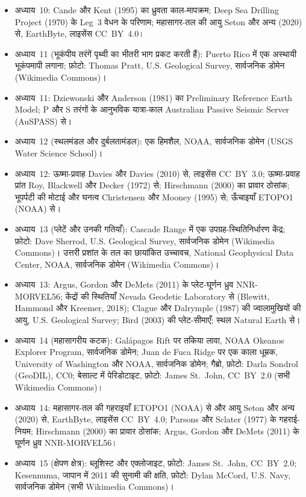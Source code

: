 \begin{itemize}
  \item अध्याय~10: Cande और Kent (1995) का ध्रुवता काल-मापक्रम; Deep Sea Drilling Project (1970) के Leg~3 वेधन के परिणाम; महासागर-तल की आयु Seton और अन्य (2020) से, EarthByte, लाइसेंस CC~BY~4.0।
  \item अध्याय~11 (भूकंपीय तरंगें पृथ्वी का भीतरी भाग प्रकट करती हैं): Puerto Rico में एक अस्थायी भूकंपमापी लगाना; फ़ोटो: Thomas Pratt, U.S. Geological Survey, सार्वजनिक डोमेन (Wikimedia Commons)।
  \item अध्याय~11: Dziewonski और Anderson (1981) का Preliminary Reference Earth Model; P और S तरंगों के आनुभविक यात्रा-काल Australian Passive Seismic Server (AuSPASS) से।
  \item अध्याय~12 (स्थलमंडल और दुर्बलतामंडल): एक हिमशैल, NOAA, सार्वजनिक डोमेन (USGS Water Science School)।
  \item अध्याय~12: ऊष्मा-प्रवाह Davies और Davies (2010) से, लाइसेंस CC~BY~3.0; ऊष्मा-प्रवाह प्रांत Roy, Blackwell और Decker (1972) से; Hirschmann (2000) का प्रावार ठोसांक; भूपर्पटी की मोटाई और घनत्व Christensen और Mooney (1995) से; ऊँचाइयाँ ETOPO1 (NOAA) से।
  \item अध्याय~13 (प्लेटें और उनकी गतियाँ): Cascade Range में एक उपग्रह-स्थितिनिर्धारण केंद्र; फ़ोटो: Dave Sherrod, U.S. Geological Survey, सार्वजनिक डोमेन (Wikimedia Commons)। उत्तरी प्रशांत के तल का छायांकित उच्चावच, National Geophysical Data Center, NOAA, सार्वजनिक डोमेन (Wikimedia Commons)।
  \item अध्याय~13: Argus, Gordon और DeMets (2011) के प्लेट-घूर्णन ध्रुव NNR-MORVEL56; केंद्रों की स्थितियाँ Nevada Geodetic Laboratory से (Blewitt, Hammond और Kreemer, 2018); Clague और Dalrymple (1987) की ज्वालामुखियों की आयु, U.S. Geological Survey; Bird (2003) की प्लेट-सीमाएँ; स्थल Natural Earth से।
  \item अध्याय~14 (महासागरीय कटक): Galápagos Rift पर तकिया लावा, NOAA Okeanos Explorer Program, सार्वजनिक डोमेन; Juan de Fuca Ridge पर एक काला धूम्रक, University of Washington और NOAA, सार्वजनिक डोमेन; गैब्रो, फ़ोटो: Darla Sondrol (GeoDIL), CC0; बेसाल्ट में पेरिडोटाइट, फ़ोटो: James St.~John, CC~BY~2.0 (सभी Wikimedia Commons)।
  \item अध्याय~14: महासागर-तल की गहराइयाँ ETOPO1 (NOAA) से और आयु Seton और अन्य (2020) से, EarthByte, लाइसेंस CC~BY~4.0; Parsons और Sclater (1977) के गहराई-नियम; Hirschmann (2000) का प्रावार ठोसांक; Argus, Gordon और DeMets (2011) के घूर्णन ध्रुव NNR-MORVEL56।
  \item अध्याय~15 (क्षेपण क्षेत्र): ब्लूशिस्ट और एक्लोजाइट, फ़ोटो: James St.~John, CC~BY~2.0; Kesennuma, जापान में 2011 की सुनामी की क्षति, फ़ोटो: Dylan McCord, U.S. Navy, सार्वजनिक डोमेन (सभी Wikimedia Commons)।

\end{itemize}
